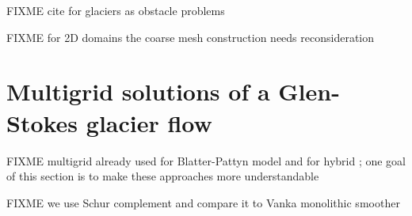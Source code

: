 \documentclass[letterpaper,final,12pt,reqno]{amsart}
\begin{document}
FIXME cite for glaciers as obstacle problems \cite{Bueler2016,Bueler2020,Calvoetal2002,JouvetBueler2012}

FIXME for 2D domains the coarse mesh construction needs reconsideration

\section{Multigrid solutions of a Glen-Stokes glacier flow} \label{sec:stokes}

FIXME multigrid already used for Blatter-Pattyn model \cite{BrownSmithAhmadia2013} and for hybrid \cite{Jouvetetal2013}; one goal of this section is to make these approaches more understandable

FIXME we use Schur complement \cite{Bueler2021,Elmanetal2014} and compare it to Vanka monolithic smoother \cite{Farrelletal2019}

\small

\bigskip


\end{document}
